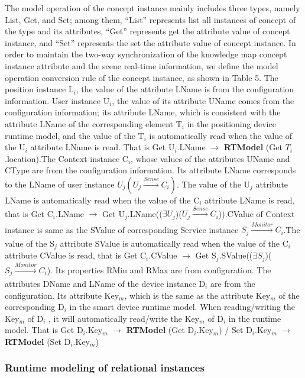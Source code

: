 The model operation of the concept instance mainly includes three types, namely List, Get, and Set; among them, “List” represents list all instances of concept of the type and its attributes, “Get” represents get the attribute value of concept instance, and “Set” represents the set the attribute value of concept instance. In order to maintain the two-way synchronization of the knowledge map concept instance attribute and the scene real-time information, we define the model operation conversion rule of the concept instance, as shown in Table 5. The position instance L$_{i}$, the value of the attribute LName is from the configuration information. User instance U$_{i}$, the value of its attribute UName comes from the configuration information; its attribute LName, which is consistent with the attribute LName of the corresponding element T$_{i}$ in the positioning device runtime model, and the value of the T$_{i}$ is automatically read when the value of the U$_{i}$ attribute LName is read. That is Get U$_{i}$.LName $\to$ \textbf{RTModel} (Get $T_{i}$.location).The Context instance C$_{i}$, whose values of the attributes UName and CType are from the configuration information. Its attribute LName corresponds to the LName of user instance $U_{j} (U_{j}\xrightarrow[]{Sense} C_{i})$. The value of the U$_{j}$ attribute LName is automatically read when the value of the C$_{i}$ attribute LName is read, that is Get C$_{i}$.LName $\to$ Get U$_{j}$.LName(($\exists U_{j}$)($U_{j}\xrightarrow[]{Sense} C_{i}$)).CValue of Context instance is same as the SValue of corresponding Service instance $S_{j}\xrightarrow[]{Monitor}C_{i}$.The value of the S$_{j}$ attribute SValue is automatically read when the value of the C$_{i}$ attribute CValue is read, that is Get C$_{i}$.CValue $\to$ Get S$_{j}$.SValue(($\exists S_{j}$)($S_{j}\xrightarrow[]{Monitor}C_{i}$). Its properties RMin and RMax are from configuration. The attributes DName and LName of the device instance D$_{i}$ are from the configuration. Its attribute Key$_{m}$, which is the same as the attribute Key$_{m}$ of the corresponding D$_{i}$ in the smart device runtime model. When reading/writing the Key$_{m}$ of D$_{i}$ , it will automatically read/write the Key$_{m}$ of D$_{i}$ in the runtime model. That is Get D$_{i}$.Key$_{m}$ $\to$ \textbf{RTModel} (Get D$_{i}$.Key$_{m}$) / Set D$_{i}$.Key$_{m}$ $\to$ \textbf{RTModel} (Set D$_{i}$.Key$_{m}$) 




\subsubsection{Runtime modeling of relational instances}
